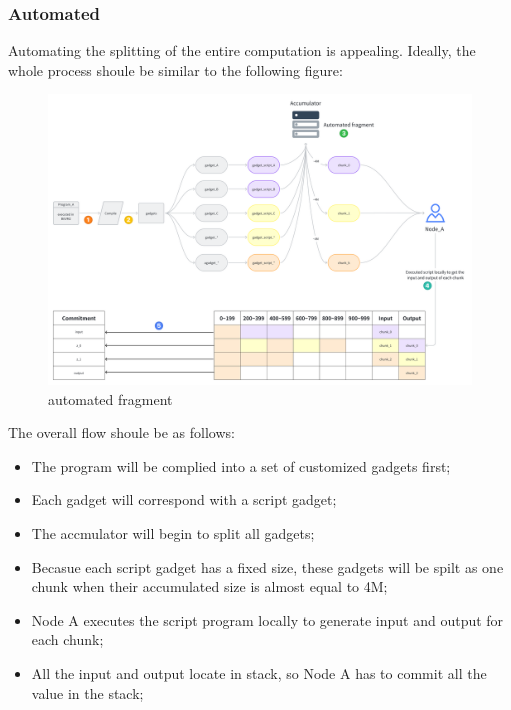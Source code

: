 \subsubsection{Automated}

Automating the splitting of the entire computation is appealing. Ideally, the whole process shoule be similar to the following figure:

\begin{figure}[ht] 
    \centering  
    \includegraphics[width=0.85\columnwidth]{images/automated-fragment.png} 
    \caption{automated fragment}
    \label{fig:automated-fragment}
\end{figure}

The overall flow shoule be as follows:
\begin{itemize}
    \item The program will be complied into a set of customized gadgets first;
    \item Each gadget will correspond with a script gadget;
    \item The accmulator will begin to split all gadgets;
    \item Becasue each script gadget has a fixed size, these gadgets will be spilt as one chunk when their accumulated size is almost equal to 4M;
    \item Node A executes the script program locally to generate input and output for each chunk;
    \item All the input and output locate in stack, so Node A has to commit all the value in the stack;
\end{itemize}

